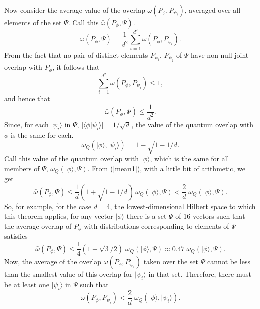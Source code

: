 \documentclass[12pt]{article}
\newcommand{\ket}[1]{|#1\rangle}
\newcommand{\bkt}[2]{\langle#1|#2\rangle}
\begin{document}
Now consider the average value of the overlap  $\omega(P_\phi, P_{\psi_i})$, averaged over all elements of the set $\Psi$. Call this $\bar{\omega}(P_\phi, \Psi)$.
\begin{equation}
\bar{\omega}(P_\phi, \Psi) = \frac{1}{d^2} \sum_{i = 1}^{d^2} \omega(P_\phi, P_{\psi_i}).
\end{equation}
From the fact that no  pair  of distinct elements $P_{\psi_i}$, $P_{\psi_j}$ of $\Psi$  have non-null joint overlap with $P_\phi$, it follows that
\begin{equation}
\sum_{i = 1}^{d^2} \omega(P_\phi, P_{\psi_i}) \leq 1,
\end{equation}
and hence that
\begin{equation}\label{mean1}
\bar{\omega}(P_\phi, \Psi) \leq \frac{1}{d^2}.
\end{equation}
Since, for each  $\ket{\psi_i}$ in $\Psi$, $|\bkt{\phi}{\psi_i}| = 1/\sqrt{d}$, the value of the quantum overlap with $\phi$ is the same for each.
\begin{equation}
\omega_Q(\ket{\phi}, \ket{\psi_i}) = 1 - \sqrt{1 - 1/d}.
\end{equation}
Call this value of the quantum overlap with $\ket{\phi}$, which is the same for all members of $\Psi$, $\omega_Q(\ket{\phi}, \Psi)$.
From (\ref{mean1}), with a little bit of arithmetic, we get
\begin{equation}\label{mean2}
\bar{\omega}(P_\phi, \Psi) \leq \frac{1}{d}\left(1 + \sqrt{1 - 1/d} \right) \, \omega_Q(\ket{\phi}, \Psi) < \frac{2}{d}  \; \omega_Q(\ket{\phi}, \Psi).
\end{equation}
So, for example, for the case $d = 4$, the lowest-dimensional Hilbert space to which this theorem applies, for any vector $\ket{\phi}$ there is a set $\Psi$ of 16 vectors such that the average overlap of $P_\phi$ with distributions corresponding to elements of $\Psi$ satisfies
\begin{equation}
\bar{\omega}(P_\phi, \Psi) \leq \frac{1}{4}(1 - \sqrt{3}/2)  \; \omega_Q(\ket{\phi}, \Psi) \approx 0.47 \; \omega_Q(\ket{\phi}, \Psi).
\end{equation}
Now, the average of the overlap $\omega(P_\phi, P_{\psi_i})$ taken over the set $\Psi$ cannot be less than the smallest value of this overlap for $\ket{\psi_i}$ in that set.  Therefore, there must be at least one $\ket{\psi_i}$ in $\Psi$ such that
\begin{equation}
\omega(P_\phi, P_{\psi_i}) < \frac{2}{d} \; \omega_Q(\ket{\phi}, \ket{\psi_i}).
\end{equation}
\end{document}
